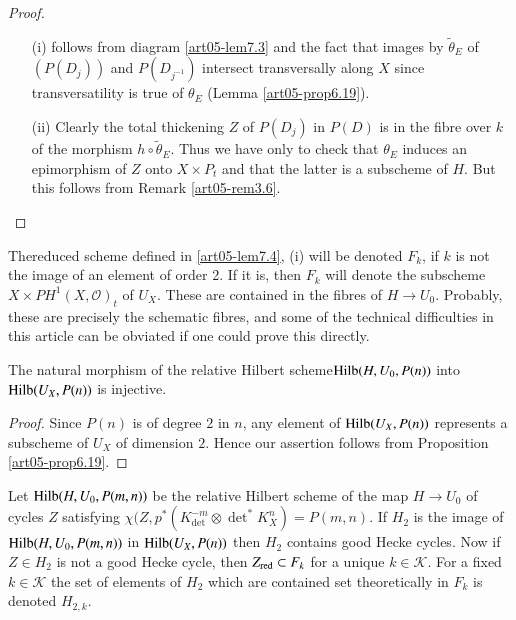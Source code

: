 \begin{proof}
\begin{itemize}
\item[(i)] follows from diagram \ref{art05-lem7.3} and the fact that
images by $\widetilde{\theta}_{E}$ of $(P(D_{j}))$ and $P(D_{j^{-1}})$
intersect transversally along $X$ since transversatility is true of
$\theta_{E}$ (Lemma \ref{art05-prop6.19}).

\item[(ii)] Clearly the total thickening $Z$ of $P(D_{j})$ in $P(D)$
is in the fibre over $k$ of the morphism
$h\circ \widetilde{\theta}_{E}$. Thus we have only to check that
$\theta_{E}$ induces an epimorphism of $Z$ onto $X\times P_{t}$ and
that the latter is a subscheme of $H$. But this follows from
Remark \ref{art05-rem3.6}. 
\end{itemize}
\end{proof}

\begin{remark}\label{art05-rem7.5}
The\pageoriginale reduced scheme defined in \ref{art05-lem7.4}, (i) will be denoted
$F_{k}$, if $k$ is not the image of an element of order 2. If it is,
then $F_{k}$ will denote the subscheme $X\times
PH^{1}(X,\mathscr{O})_{t}$ of $U_{X}$. These are contained in the
fibres of $H\to U_{0}$. Probably, these are precisely the schematic
fibres, and some of the technical difficulties in this article can be
obviated if one could prove this directly.
\end{remark}

\begin{lemma}\label{art05-lem7.6}
The natural morphism of the relative Hilbert scheme\break $\operatorname{Hilb}
(H,U_{0},P(n))$ into $\operatorname{Hilb}(U_{X},P(n))$ is injective.
\end{lemma}

\begin{proof}
Since $P(n)$ is of degree $2$ in $n$, any element of
$\operatorname{Hilb}(U_{X},P(n))$ represents a subscheme of $U_{X}$ of dimension
$2$. Hence our assertion follows from Proposition \ref{art05-prop6.19}.
\end{proof}

Let $\operatorname{Hilb}(H,U_{0},P(m,n))$ be the relative Hilbert scheme of the map
$H\to U_{0}$ of cycles $Z$ satisfying
$\chi(Z,p^{*}(K^{-m}_{\det}\otimes \det^{*}K^{n}_{X})=P(m,n)$. If
$H_{2}$ is the image of $\operatorname{Hilb}(H,U_{0},P(m,n))$ in $\operatorname{Hilb}
(U_{X},P(n))$ then $H_{2}$ contains good Hecke cycles. Now if $Z\in
H_{2}$ is not a good Hecke cycle, then $Z_{\operatorname{red}}\subset F_{k}$ for a
unique $k\in \mathscr{K}$. For a fixed $k\in \mathscr{K}$ the set of
elements of $H_{2}$ which are contained set theoretically in $F_{k}$
is denoted $H_{2,k}$. 

